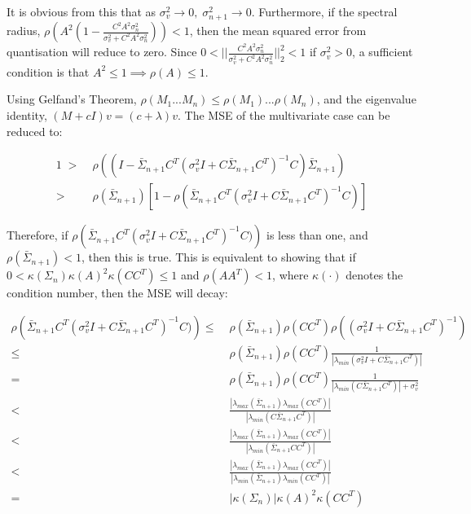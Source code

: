 \documentclass[../main.tex]{subfiles}
\begin{document}
{It is obvious from this that as $\sigma_v^2 \rightarrow 0, \; \sigma_{n+1}^2 \rightarrow 0$. Furthermore, if the spectral radius, $\rho \left(A^2(1 - \frac{C^2 A^2\sigma_n^2}{\sigma_v^2 + C^2 A^2 \sigma_n^2}) \right) < 1$, then the mean squared error from quantisation will reduce to zero. Since $0 < ||\frac{C^2 A^2\sigma_n^2}{\sigma_v^2 + C^2 A^2 \sigma_n^2}||^2_2 < 1$ if $\sigma_v^2 > 0$, a sufficient condition is that $A^2 \leq 1 \implies \rho(A) \leq 1$.

Using Gelfand's Theorem, $\rho(M_1 ... M_n) \leq \rho(M_1)...\rho(M_n)$, and the eigenvalue identity, $(M+cI)v = (c+\lambda)v$. The MSE of the multivariate case can be reduced to:

\begin{align}
1\;  > \; & \rho\left((I - \bar{\Sigma}_{n+1}C^T (\sigma_v^2 I + C \bar{\Sigma}_{n+1} C^T)^{-1} C)\bar{\Sigma}_{n+1}\right) \\
> \; & \rho(\bar{\Sigma}_{n+1})\left[ 1 - \rho(\bar{\Sigma}_{n+1}C^T (\sigma_v^2 I + C \bar{\Sigma}_{n+1} C^T)^{-1} C)  \right] 
\end{align}

Therefore, if $\rho\left(\bar{\Sigma}_{n+1}C^T (\sigma_v^2 I + C \bar{\Sigma}_{n+1} C^T)^{-1} C)\right)$ is less than one, and $\rho(\bar{\Sigma}_{n+1}) < 1$, then this is true. This is equivalent to showing that if $0 < \kappa(\Sigma_{n})\kappa(A)^2 \kappa(CC^T) \leq 1$ and $\rho(AA^T) < 1$, where $\kappa(\cdot)$ denotes the condition number, then the MSE will decay:

\begin{align*}
  \rho\left(\bar{\Sigma}_{n+1}C^T (\sigma_v^2 I + C \bar{\Sigma}_{n+1} C^T)^{-1} C)\right) 
    \leq \; & \rho(\bar{\Sigma}_{n+1})\rho(CC^T) \rho((\sigma_v^2 I + C \bar{\Sigma}_{n+1} C^T)^{-1}) \\
    \leq \; & \rho(\bar{\Sigma}_{n+1})\rho(C C^T) \frac{1}{|\lambda_{min}(\sigma_v^2 I + C \bar{\Sigma}_{n+1} C^T)|} \\
    = \; & \rho(\bar{\Sigma}_{n+1})\rho(CC^T) \frac{1}{|\lambda_{min}(C \bar{\Sigma}_{n+1} C^T)| + \sigma_v^2} \\
    < \; & \frac{|\lambda_{max}(\bar{\Sigma}_{n+1})\lambda_{max}(CC^T)|}{|\lambda_{min}(C \bar{\Sigma}_{n+1} C^T)|} \\
    < \; & \frac{|\lambda_{max}(\bar{\Sigma}_{n+1})\lambda_{max}(CC^T)|}{|\lambda_{min}(\bar{\Sigma}_{n+1}CC^T)|} \\
    < \; & \frac{|\lambda_{max}(\bar{\Sigma}_{n+1})\lambda_{max}(CC^T)|}{|\lambda_{min}(\bar{\Sigma}_{n+1})\lambda_{min}(CC^T)|} \\
    = \; &  |\kappa(\Sigma_{n})|\kappa(A)^2 \kappa(CC^T)
\end{align*}

}
\end{document}
